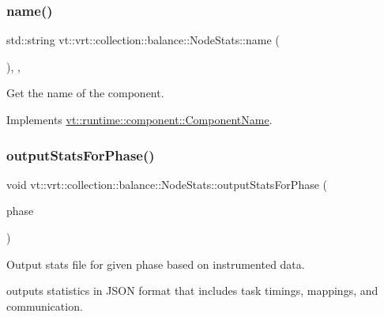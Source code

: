 \subsubsection{\texorpdfstring{name()}{name()}}
{\footnotesize\ttfamily std\+::string vt\+::vrt\+::collection\+::balance\+::\+Node\+Stats\+::name (\begin{DoxyParamCaption}{ }\end{DoxyParamCaption})\hspace{0.3cm}{\ttfamily [inline]}, {\ttfamily [override]}, {\ttfamily [virtual]}}



Get the name of the component. 



Implements \hyperlink{structvt_1_1runtime_1_1component_1_1_component_name_a33c06229bb605a2b2ceff68830d6d773}{vt\+::runtime\+::component\+::\+Component\+Name}.

\mbox{\label{structvt_1_1vrt_1_1collection_1_1balance_1_1_node_stats_aa6e33fd5ae9275515557ada40ef3d489}} 
\subsubsection{\texorpdfstring{output\+Stats\+For\+Phase()}{outputStatsForPhase()}}
{\footnotesize\ttfamily void vt\+::vrt\+::collection\+::balance\+::\+Node\+Stats\+::output\+Stats\+For\+Phase (\begin{DoxyParamCaption}\item[{\hyperlink{namespacevt_a46ce6733d5cdbd735d561b7b4029f6d7}{Phase\+Type}}]{phase }\end{DoxyParamCaption})}



Output stats file for given phase based on instrumented data. 

outputs statistics in J\+S\+ON format that includes task timings, mappings, and communication. \mbox{\label{structvt_1_1vrt_1_1collection_1_1balance_1_1_node_stats_ad016b4beb97dbb65ac0f499427e9658c}} 

